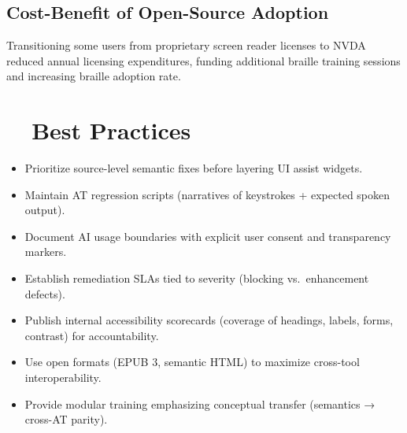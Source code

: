 \subsection*{Cost-Benefit of Open-Source Adoption}
Transitioning some users from proprietary screen reader licenses to NVDA reduced annual licensing expenditures, funding additional braille training sessions and increasing braille adoption rate\supercite{Burgstahler2015}.

\section{~~Best Practices}
\label{sec:ch28-best-practices}
\begin{itemize}
	\item Prioritize source-level semantic fixes before layering UI assist widgets.
	\item Maintain AT regression scripts (narratives of keystrokes + expected spoken output).
	\item Document AI usage boundaries with explicit user consent and transparency markers.
	\item Establish remediation SLAs tied to severity (blocking vs.\ enhancement defects).
	\item Publish internal accessibility scorecards (coverage of headings, labels, forms, contrast) for accountability.
	\item Use open formats (EPUB 3, semantic HTML) to maximize cross-tool interoperability.
	\item Provide modular training emphasizing conceptual transfer (semantics → cross-AT parity).
\end{itemize}

